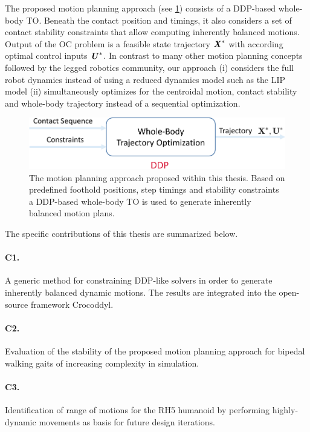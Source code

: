 The proposed motion planning approach (see \cref{img:approach}) consists of a DDP-based whole-body \gls{TO}. 
Beneath the contact position and timings, it also considers a set of contact stability constraints that allow computing inherently balanced motions. Output of the \gls{OC} problem is a feasible state trajectory $\bm{\mathit{X}}^*$ with according optimal control inputs $\bm{\mathit{U}}^*$. In contrast to many other motion planning concepts followed by the legged robotics community, our approach (i) considers the full robot dynamics instead of using a reduced dynamics model such as the \gls{LIP} model (ii) simultaneously optimizes for the centroidal motion, contact stability and whole-body trajectory instead of a sequential optimization. 

\begin{figure}
\centering	
\includegraphics[width=.8\textwidth]{img/approach}
\caption[Overall motion planning approach proposed within this thesis]{The motion planning approach proposed within this thesis. Based on predefined foothold positions, step timings and stability constraints a \gls{DDP}-based whole-body \gls{TO} is used to generate inherently balanced motion plans.}
\label{img:approach}
\end{figure}

The specific contributions of this thesis are summarized below.

\paragraph{C1.} A generic method for constraining DDP-like solvers in order to generate inherently balanced dynamic motions. The results are integrated into the open-source framework Crocoddyl.
\paragraph{C2.} Evaluation of the stability of the proposed motion planning approach for bipedal walking gaits of increasing complexity in simulation. 
\paragraph{C3.} Identification of range of motions for the RH5 humanoid by performing highly-dynamic movements as basis for future design iterations. 
